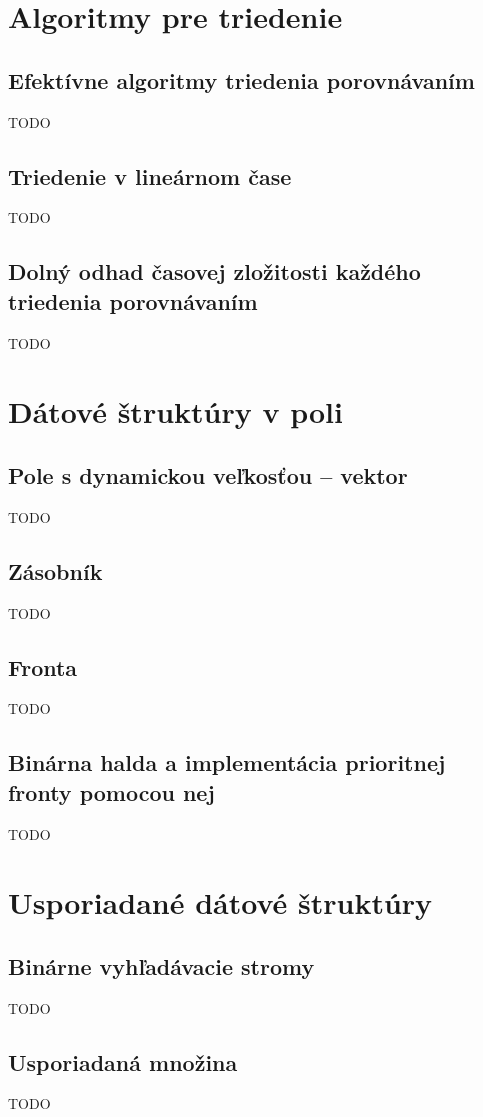 \section{Algoritmy pre triedenie}

	\subsection{Efektívne algoritmy triedenia porovnávaním} TODO
	\subsection{Triedenie v lineárnom čase} TODO
	\subsection{Dolný odhad časovej zložitosti každého triedenia porovnávaním} TODO

\section{Dátové štruktúry v poli}
	\subsection{Pole s dynamickou veľkosťou – vektor} TODO
	\subsection{Zásobník} TODO
	\subsection{Fronta} TODO
	\subsection{Binárna halda a implementácia prioritnej fronty pomocou nej} TODO

\section{Usporiadané dátové štruktúry}
	\subsection{Binárne vyhľadávacie stromy} TODO
	\subsection{Usporiadaná množina} TODO
